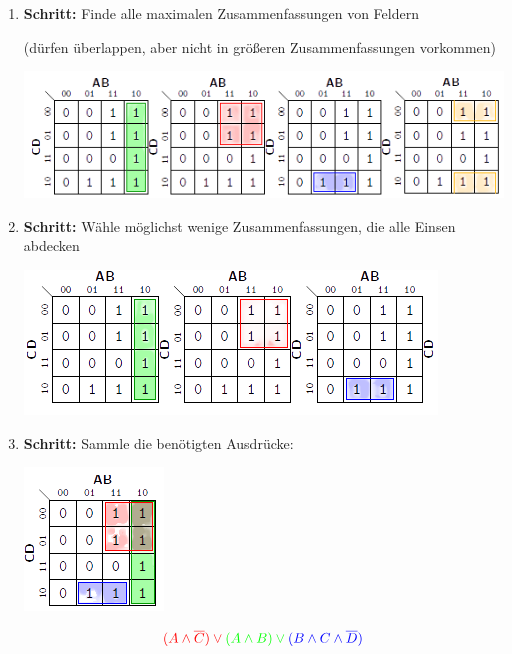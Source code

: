 \documentclass[12pt]{report}
\begin{document}
\begin{enumerate}
  \item \textbf{Schritt:}
        Finde alle maximalen Zusammenfassungen von Feldern
        
        (dürfen überlappen, aber nicht in größeren Zusammenfassungen vorkommen)
        
        \begin{center}
          \includegraphics[scale=1]{../graphics/karnaugh-veitch-step_01}
        \end{center}
        
        
  \item \textbf{Schritt:}
        Wähle möglichst wenige Zusammenfassungen, die alle Einsen abdecken
        
        \begin{center}
          \includegraphics[scale=1]{../graphics/karnaugh-veitch-step_02}
        \end{center}
        
        
  \item \textbf{Schritt:}
        Sammle die benötigten Ausdrücke:
        \begin{center}
          \includegraphics[scale=1]{../graphics/karnaugh-veitch-step_03}
        \end{center}
        $$\color{red}{(A \wedge \overline{C})} \vee \color{green}{(A \wedge B)} \vee \color{blue}{(B \wedge C \wedge \overline{D})}$$
\end{enumerate}
\end{document}
